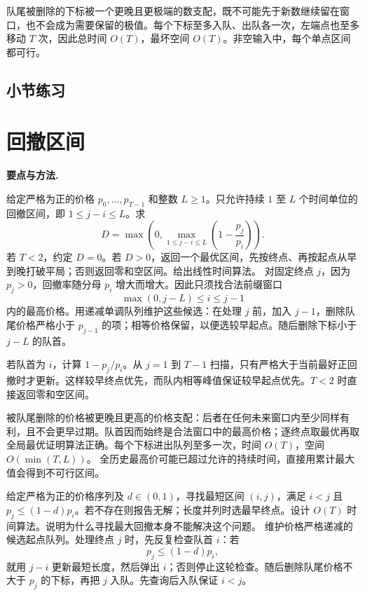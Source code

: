 队尾被删除的下标被一个更晚且更极端的数支配，既不可能先于新数继续留在窗口，也不会成为需要保留的极值。每个下标至多入队、出队各一次，左端点也至多移动 $T$ 次，因此总时间 $O(T)$，最坏空间 $O(T)$。非空输入中，每个单点区间都可行。



\par{}
\subsection*{小节练习}



\section{回撤区间}
\noindent\textbf{要点与方法.}\enspace


给定严格为正的价格 $p_0,\ldots,p_{T-1}$ 和整数 $L\ge1$。只允许持续 $1$ 至 $L$ 个时间单位的回撤区间，即 $1\le j-i\le L$。求
\[
D=\max\left(0,\max_{1\le j-i\le L}\left(1-\frac{p_j}{p_i}\right)\right).
\]
若 $T<2$，约定 $D=0$。若 $D>0$，返回一个最优区间，先按终点、再按起点从早到晚打破平局；否则返回零和空区间。给出线性时间算法。
\solution 对固定终点 $j$，因为 $p_j>0$，回撤率随分母 $p_i$ 增大而增大。因此只须找合法前缀窗口
\[
\max(0,j-L)\le i\le j-1
\]
内的最高价格。用递减单调队列维护这些候选：在处理 $j$ 前，加入 $j-1$，删除队尾价格严格小于 $p_{j-1}$ 的项；相等价格保留，以便选较早起点。随后删除下标小于 $j-L$ 的队首。

若队首为 $i$，计算 $1-p_j/p_i$。从 $j=1$ 到 $T-1$ 扫描，只有严格大于当前最好正回撤时才更新。这样较早终点优先，而队内相等峰值保证较早起点优先。$T<2$ 时直接返回零和空区间。

被队尾删除的价格被更晚且更高的价格支配：后者在任何未来窗口内至少同样有利，且不会更早过期。队首因而始终是合法窗口中的最高价格；逐终点取最优再取全局最优证明算法正确。每个下标进出队列至多一次，时间 $O(T)$，空间 $O(\min(T,L))$。
\pitfall 全历史最高价可能已超过允许的持续时间，直接用累计最大值会得到不可行区间。

给定严格为正的价格序列及 $d\in(0,1)$，寻找最短区间 $(i,j)$，满足 $i<j$ 且 $p_j\le(1-d)p_i$。若不存在则报告无解；长度并列时选最早终点。设计 $O(T)$ 时间算法。说明为什么寻找最大回撤本身不能解决这个问题。
\solution 维护价格严格递减的候选起点队列。处理终点 $j$ 时，先反复检查队首 $i$：若
\[
p_j\le(1-d)p_i,
\]
就用 $j-i$ 更新最短长度，然后弹出 $i$；否则停止这轮检查。随后删除队尾价格不大于 $p_j$ 的下标，再把 $j$ 入队。先查询后入队保证 $i<j$。


